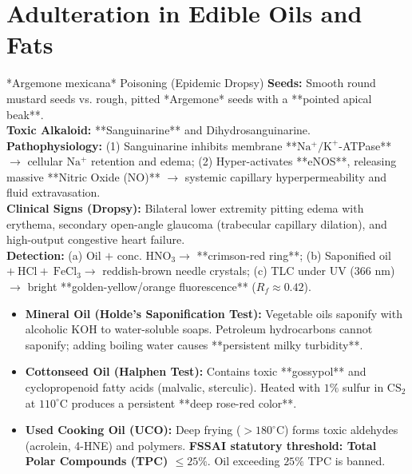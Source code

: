 \documentclass[10pt,a4paper,oneside]{article}
\begin{document}
\section{Adulteration in Edible Oils and Fats}

\begin{hazardbox}{*Argemone mexicana* Poisoning (Epidemic Dropsy)}
\textbf{Seeds:} Smooth round mustard seeds vs. rough, pitted *Argemone* seeds with a **pointed apical beak**.\\
\textbf{Toxic Alkaloid:} **Sanguinarine** and Dihydrosanguinarine.\\
\textbf{Pathophysiology:} (1) Sanguinarine inhibits membrane **$\mathrm{Na^+/K^+}$-ATPase** $\rightarrow$ cellular $\mathrm{Na^+}$ retention and edema; (2) Hyper-activates **eNOS**, releasing massive **Nitric Oxide ($\mathrm{NO}$)** $\rightarrow$ systemic capillary hyperpermeability and fluid extravasation.\\
\textbf{Clinical Signs (Dropsy):} Bilateral lower extremity pitting edema with erythema, secondary open-angle glaucoma (trabecular capillary dilation), and high-output congestive heart failure.\\
\textbf{Detection:} (a) Oil $+$ conc. $\mathrm{HNO_3} \rightarrow$ **crimson-red ring**; (b) Saponified oil $+\ \mathrm{HCl} +\ \mathrm{FeCl_3} \rightarrow$ reddish-brown needle crystals; (c) TLC under UV ($366\text{ nm}$) $\rightarrow$ bright **golden-yellow/orange fluorescence** ($R_f \approx 0.42$).
\end{hazardbox}

\begin{itemize}[leftmargin=*]
    \item \textbf{Mineral Oil (Holde's Saponification Test):} Vegetable oils saponify with alcoholic $\mathrm{KOH}$ to water-soluble soaps. Petroleum hydrocarbons cannot saponify; adding boiling water causes **persistent milky turbidity**.
    \item \textbf{Cottonseed Oil (Halphen Test):} Contains toxic **gossypol** and cyclopropenoid fatty acids (malvalic, sterculic). Heated with $1\%$ sulfur in $\mathrm{CS_2}$ at $110^\circ\text{C}$ produces a persistent **deep rose-red color**.
    \item \textbf{Used Cooking Oil (UCO):} Deep frying ($>180^\circ\text{C}$) forms toxic aldehydes (acrolein, 4-HNE) and polymers. \textbf{FSSAI statutory threshold: Total Polar Compounds (TPC) $\le 25\%$}. Oil exceeding $25\%$ TPC is banned.
\end{itemize}
\end{document}
